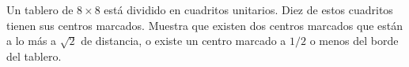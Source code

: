 Un tablero de $8\times 8$ está dividido en cuadritos unitarios. Diez de estos cuadritos tienen sus centros marcados. Muestra que existen dos centros marcados que están a lo más a $\sqrt{2}$ de distancia, o existe un centro marcado a $1/2$ o menos del borde del tablero.